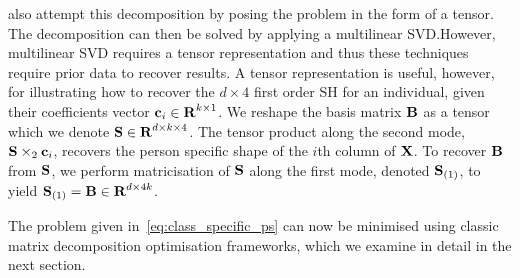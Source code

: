 \citet{minsik2014realtime,minsik2011fast} also attempt this decomposition by
posing the problem in the form of a tensor. The decomposition can then be solved
by applying a multilinear SVD.\@ However, multilinear SVD requires a tensor
representation and thus these techniques require prior data to recover results.
A tensor representation is useful, however, for illustrating how to recover the
$d \times 4$ first order SH for an individual, given their coefficients vector
$\boldsymbol{\mathbf{c}}_i \in \boldsymbol{\mathbf{R}}^{k \times 1}$. We reshape the basis matrix
$\boldsymbol{\mathbf{B}}$ as a tensor which we denote $\boldsymbol{\mathbf{S}} \in \boldsymbol{\mathbf{R}}^{d \times k
\times 4}$. The tensor product along the second mode, $\boldsymbol{\mathbf{S}} \times_2 \boldsymbol{\mathbf{c}}_i$, 
recovers the person specific shape of the $i$th column of
$\boldsymbol{\mathbf{X}}$. To recover $\boldsymbol{\mathbf{B}}$ from $\boldsymbol{\mathbf{S}}$, we perform
matricisation of $\boldsymbol{\mathbf{S}}$ along the first mode, denoted $\boldsymbol{\mathbf{S}}_{(1)}$,
to yield $\boldsymbol{\mathbf{S}}_{(1)} = \boldsymbol{\mathbf{B}} \in \boldsymbol{\mathbf{R}}^{d \times 4k}$.

The problem given in~\eqref{eq:class_specific_ps} can now be minimised using
classic matrix decomposition optimisation frameworks, which we examine in
detail in the next section.

